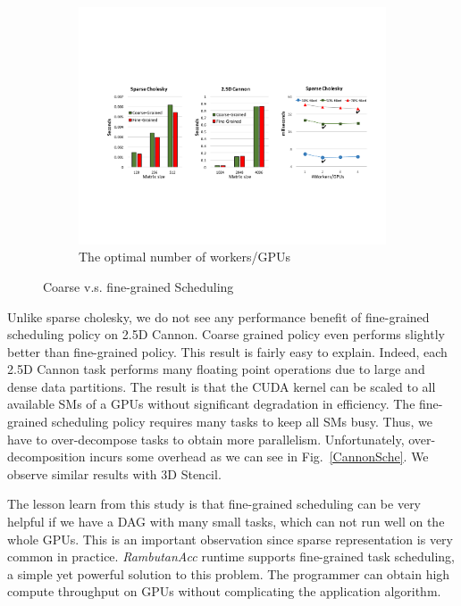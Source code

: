 \begin{figure}[htb]
\begin{subfigure}{0.33\textwidth}
\includegraphics[width=\textwidth]{figures/nWorkers.pdf}
\caption{The optimal number of workers/GPUs}
\label{fig:nWorkers}
\end{subfigure}
\caption{Coarse v.s. fine-grained Scheduling}
\label{fig:coarseFine}
\end{figure}





Unlike sparse cholesky, we do not see any performance benefit of fine-grained scheduling policy on 2.5D Cannon.
Coarse grained policy even performs slightly better than fine-grained policy.
This result is fairly easy to explain.
Indeed, each 2.5D Cannon task performs many floating point operations due to large and dense data partitions.
The result is that the CUDA kernel can be scaled to all available SMs of a GPUs without significant degradation in efficiency.
The fine-grained scheduling policy requires many tasks to keep all SMs busy.
Thus, we have to over-decompose tasks to obtain more parallelism.
Unfortunately, over-decomposition incurs some overhead as we can see in Fig.~\ref{CannonSche}.
We observe similar results with 3D Stencil.

The lesson learn from this study is that fine-grained scheduling can be very helpful if we have a DAG with many small tasks, which can not run well on the whole GPUs.
This is an important observation since sparse representation is very common in practice.
{\em RambutanAcc} runtime supports fine-grained task scheduling, a simple yet powerful solution to this problem.
The programmer can obtain high compute throughput on GPUs without complicating the application algorithm.

